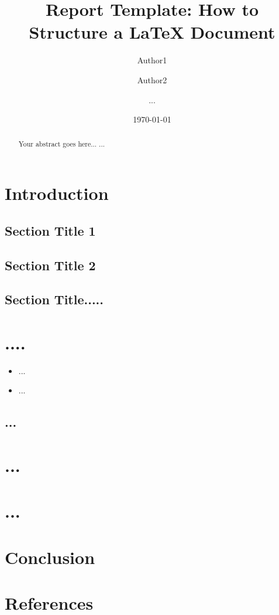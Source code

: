 \documentclass[11pt,a4paper]{report}
\begin{document}
\title{Report Template: How to Structure a LaTeX Document}
\author{Author1 \and Author2 \and ...}
\date{\today}
\maketitle

\begin{abstract}
Your abstract goes here...
...
\end{abstract}

\chapter{Introduction}
\section{Section Title 1}
\section{Section Title 2}
\section{Section Title.....}

\chapter{....}


\begin{itemize}
\item ...
\item ...
\end{itemize}

\section{...}
\chapter{...}


\chapter{...}


\chapter{Conclusion}


\chapter*{References}
\end{document}

